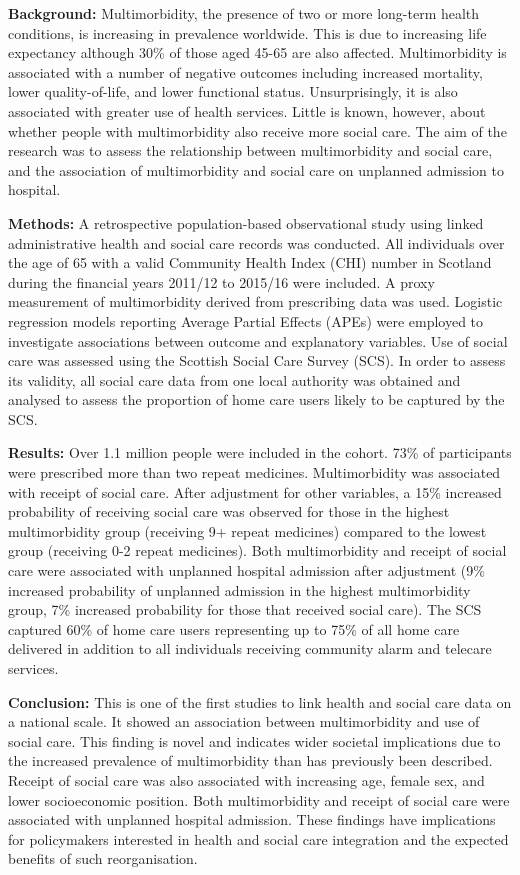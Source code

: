 \documentclass[12pt,a4paper,oneside,table]{report}
\begin{document}
\textbf{Background:} Multimorbidity, the presence of two or more
long-term health conditions, is increasing in prevalence worldwide. This
is due to increasing life expectancy although 30\% of those aged 45-65
are also affected. Multimorbidity is associated with a number of
negative outcomes including increased mortality, lower quality-of-life,
and lower functional status. Unsurprisingly, it is also associated with
greater use of health services. Little is known, however, about whether
people with multimorbidity also receive more social care. The aim of the
research was to assess the relationship between multimorbidity and
social care, and the association of multimorbidity and social care on
unplanned admission to hospital.

\textbf{Methods:} A retrospective population-based observational study
using linked administrative health and social care records was
conducted. All individuals over the age of 65 with a valid Community
Health Index (CHI) number in Scotland during the financial years 2011/12
to 2015/16 were included. A proxy measurement of multimorbidity derived
from prescribing data was used. Logistic regression models reporting
Average Partial Effects (APEs) were employed to investigate associations
between outcome and explanatory variables. Use of social care was
assessed using the Scottish Social Care Survey (SCS). In order to assess
its validity, all social care data from one local authority was obtained
and analysed to assess the proportion of home care users likely to be
captured by the SCS.

\textbf{Results:} Over 1.1 million people were included in the cohort.
73\% of participants were prescribed more than two repeat medicines.
Multimorbidity was associated with receipt of social care. After
adjustment for other variables, a 15\% increased probability of
receiving social care was observed for those in the highest
multimorbidity group (receiving 9+ repeat medicines) compared to the
lowest group (receiving 0-2 repeat medicines). Both multimorbidity and
receipt of social care were associated with unplanned hospital admission
after adjustment (9\% increased probability of unplanned admission in
the highest multimorbidity group, 7\% increased probability for those
that received social care). The SCS captured 60\% of home care users
representing up to 75\% of all home care delivered in addition to all
individuals receiving community alarm and telecare services.

\textbf{Conclusion:} This is one of the first studies to link health and
social care data on a national scale. It showed an association between
multimorbidity and use of social care. This finding is novel and
indicates wider societal implications due to the increased prevalence of
multimorbidity than has previously been described. Receipt of social
care was also associated with increasing age, female sex, and lower
socioeconomic position. Both multimorbidity and receipt of social care
were associated with unplanned hospital admission. These findings have
implications for policymakers interested in health and social care
integration and the expected benefits of such reorganisation.
\end{document}
